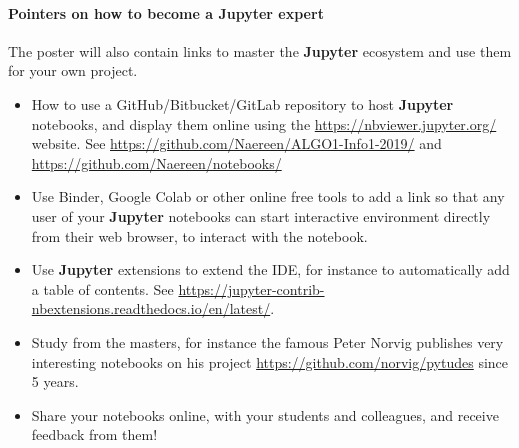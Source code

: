 \documentclass[runningheads]{llncs}
\newcommand{\Jupyter}{\textbf{Jupyter}}
\begin{document}




\paragraph{Pointers on how to become a \Jupyter{} expert}

The poster will also contain links to master the \Jupyter{} ecosystem and use them for your own project.

\begin{itemize}
    \item How to use a GitHub/Bitbucket/GitLab repository to host \Jupyter{} notebooks, and display them online using the \url{https://nbviewer.jupyter.org/} website.
    See \url{https://github.com/Naereen/ALGO1-Info1-2019/} and \url{https://github.com/Naereen/notebooks/}
    \item Use Binder, Google Colab or other online free tools to add a link so that any user of your \Jupyter{} notebooks can start interactive environment directly from their web browser, to interact with the notebook.
    \item Use \Jupyter{} extensions to extend the IDE, for instance to automatically add a table of contents. See \url{https://jupyter-contrib-nbextensions.readthedocs.io/en/latest/}.
    \item Study from the masters, for instance the famous Peter Norvig publishes very interesting notebooks on his project \url{https://github.com/norvig/pytudes} since 5 years.
    \item Share your notebooks online, with your students and colleagues, and receive feedback from them!
\end{itemize}
\end{document}

